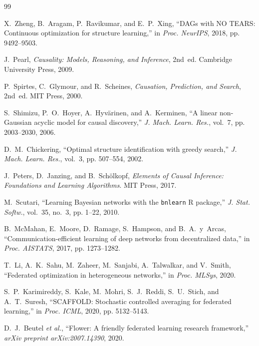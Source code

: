\documentclass[journal]{IEEEtran}
\begin{document}
\newpage
\begin{thebibliography}{99}

  X.~Zheng, B.~Aragam, P.~Ravikumar, and E.~P.~Xing,
  ``DAGs with NO TEARS: Continuous optimization for structure learning,''
  in \emph{Proc. NeurIPS}, 2018, pp. 9492--9503.

  J.~Pearl,
  \emph{Causality: Models, Reasoning, and Inference}, 2nd~ed.
  Cambridge University Press, 2009.

  P.~Spirtes, C.~Glymour, and R.~Scheines,
  \emph{Causation, Prediction, and Search}, 2nd~ed.
  MIT Press, 2000.

  S.~Shimizu, P.~O.~Hoyer, A.~Hyv\"arinen, and A.~Kerminen,
  ``A linear non-Gaussian acyclic model for causal discovery,''
  \emph{J. Mach. Learn. Res.}, vol.~7, pp. 2003--2030, 2006.

  D.~M.~Chickering,
  ``Optimal structure identification with greedy search,''
  \emph{J. Mach. Learn. Res.}, vol.~3, pp. 507--554, 2002.

  J.~Peters, D.~Janzing, and B.~Sch\"olkopf,
  \emph{Elements of Causal Inference: Foundations and Learning Algorithms}.
  MIT Press, 2017.

  M.~Scutari,
  ``Learning Bayesian networks with the \texttt{bnlearn} {R} package,''
  \emph{J. Stat. Softw.}, vol.~35, no.~3, pp. 1--22, 2010.

  B.~McMahan, E.~Moore, D.~Ramage, S.~Hampson, and B.~A.~y~Arcas,
  ``Communication-efficient learning of deep networks from decentralized data,''
  in \emph{Proc. AISTATS}, 2017, pp. 1273--1282.

  T.~Li, A.~K.~Sahu, M.~Zaheer, M.~Sanjabi, A.~Talwalkar, and V.~Smith,
  ``Federated optimization in heterogeneous networks,''
  in \emph{Proc. MLSys}, 2020.

  S.~P.~Karimireddy, S.~Kale, M.~Mohri, S.~J.~Reddi, S.~U.~Stich, and A.~T.~Suresh,
  ``{SCAFFOLD}: Stochastic controlled averaging for federated learning,''
  in \emph{Proc. ICML}, 2020, pp. 5132--5143.

  D.~J.~Beutel \emph{et al.},
  ``Flower: A friendly federated learning research framework,''
  \emph{arXiv preprint arXiv:2007.14390}, 2020.


\end{thebibliography}
\end{document}
